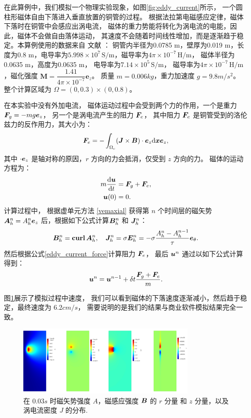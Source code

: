 在此算例中，我们模拟一个物理实验现象，如图\ref{fig:eddy_current}所示，
一个圆柱形磁体自由下落进入垂直放置的铜管的过程。
根据法拉第电磁感应定律，磁体下落时在铜管中会感应出涡电流，
磁体的重力势能将转化为涡电流的电能，因此，磁体不会做自由落体运动，
其速度不会随着时间线性增加，而是逐渐趋于稳定。本算例使用的数据来自
文献 \cite{levin2006electromagnetic}：
铜管内半径为0.0785 m，壁厚为0.019 m，长度为0.8 m，电导率为\( 5.998 \times 10^7 \,
\text{S/m} \)，磁导率为\( 4\pi \times 10^{-7} \, \text{H/m} \)，
磁体半径为0.0635 m，高度为0.0635  m，
电导率为\( 7.14 \times 10^5 \, \text{S/m} \)，
磁导率为\( 4\pi \times 10^{-7} \, \text{H/m} \)，磁化强度
$\bm M = \dfrac{1.41}{4\pi \times 10^{-7}} \bm e_{z}$。
质量 $m = 0.006kg$，重力加速度 $g = 9.8 m/s^2$。
整个计算区域为 $\Omega = (0, 0.3) \times (0, 0.8)$。

在本实验中没有外加电流，
磁体运动过程中会受到两个力的作用，一个是重力 $\boldsymbol{F}_g = -mg\boldsymbol{e}_z$，
另一个是涡电流产生的阻力 $\boldsymbol{F}_e$，
其中阻力 $\boldsymbol{F}_{e}$ 是铜管受到的洛伦兹力的反作用力，其大小为：
\begin{equation}
\label{eddy_current_force}
\boldsymbol{F}_{e} = -\int_{\Omega_c} (\boldsymbol{J} \times \boldsymbol{B})\cdot\boldsymbol{e}_z \mathrm{ d} \bm x \boldsymbol{e}_z,
\end{equation}
其中 $\cdot \boldsymbol{e}_z$ 是轴对称的原因，$r$ 方向的力会抵消，仅受到 $z$ 方向的力。
磁体的运动方程为：
$$
\begin{aligned}
    m\frac{\mathrm{ d} \boldsymbol{u}}{\mathrm{ d} t} & = \boldsymbol{F}_{g} + \boldsymbol{F}_{e},\\
\boldsymbol{u}(0) & = 0.
\end{aligned}
$$
计算过程中，
根据虚单元方法 \eqref{vemaxial} 
获得第 $n$ 个时间层的磁矢势 $\boldsymbol{A}^n_h = A^n_h\boldsymbol{e}_z$ 后，根据如下公式计算$\boldsymbol{B}^n_h$ 和
$\boldsymbol{J}^n_h$：
$$
\boldsymbol{B}^n_h = \operatorname{\textbf{curl}} \boldsymbol{A}^n_h, \quad \boldsymbol{J}^n_h = \sigma\boldsymbol{E}^n_h = -\sigma
\frac{A^n_h - A^{n-1}_h}{\tau}\boldsymbol{e}_{\theta}.
$$
然后根据公式\eqref{eddy_current_force}计算阻力 $\boldsymbol{F}_{e}$，
最后 $\boldsymbol{u}^n$ 通过以如下公式计算得到：
$$
\boldsymbol{u}^n = \boldsymbol{u}^{n-1} + \delta t \frac{\boldsymbol{F}_{g} + \boldsymbol{F}_{e}}{m}.
$$

图\ref{fig:eddy_current_result}展示了模拟过程中速度，
我们可以看到磁体的下落速度逐渐减小，然后趋于稳定，最终速度为
$6.2 cm/s$，
需要说明的是我们的结果与商业软件模拟结果完全一致。

\begin{figure}[H]
\centering
\includegraphics[width=0.8\textwidth]{./figures/movingmaxwell/ABXBYJ.pdf}
\caption{在 $0.03s$ 时磁矢势强度 $A$，磁感应强度 $\boldsymbol{B}$ 的 $r$ 分量
和 $z$ 分量，以及涡电流密度 $J$ 的分布.}
\label{fig:eddy_current_result}
\end{figure}


